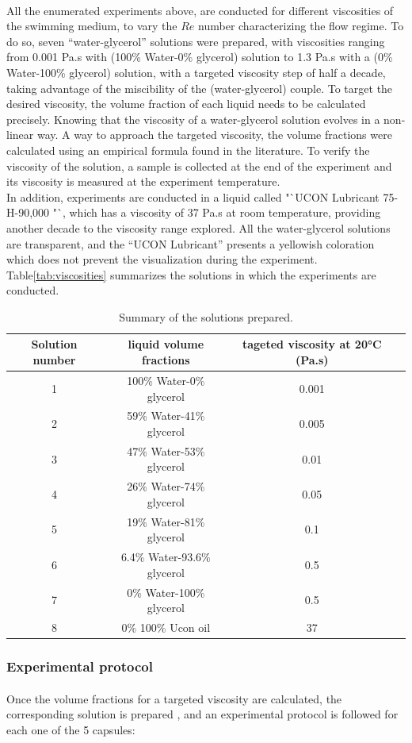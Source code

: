 \paragraph{}
All the enumerated experiments above, are conducted for different viscosities of the swimming medium, to vary the $Re$ number characterizing the flow regime. To do so, seven "`water-glycerol"' solutions were prepared, with viscosities ranging from 0.001 Pa.s with (100\% Water-0\% glycerol) solution  to 1.3 Pa.s with a (0\% Water-100\% glycerol) solution, with a targeted viscosity step of half a decade, taking advantage of the miscibility of the (water-glycerol) couple. To target the desired viscosity, the volume fraction of each liquid needs to be calculated precisely. Knowing that the viscosity of a water-glycerol solution evolves in a non-linear way\cite{viscositynonlinearCheng}. A way to approach the targeted viscosity, the volume fractions were calculated using an empirical formula found in the literature\cite{viscositynonlinearCheng}. To verify the viscosity of the solution, a sample is collected at the end of the experiment and its viscosity is measured at the experiment temperature.\\
In addition, experiments are conducted in a liquid called "`UCON Lubricant 75-H-90,000 "`, which has a viscosity of 37 Pa.s at room temperature, providing another decade to the viscosity range explored. All the water-glycerol solutions are transparent, and the "`UCON Lubricant"' presents a yellowish coloration which does not prevent the visualization during the experiment. 
Table\ref{tab:viscosities} summarizes the solutions in which the experiments are conducted.
\begin{table}[H]
	\centering
		\begin{adjustbox}{width=\textwidth}
			\begin{tabular}{|c|c|c|c|}
				\hline
				Solution number & liquid volume fractions & tageted viscosity at 20°C (Pa.s)\\
				\hline
				1&100\% Water-0\% glycerol&0.001\\
				2&59\% Water-41\% glycerol&0.005\\
				3&47\% Water-53\% glycerol&0.01\\
				4&26\% Water-74\% glycerol&0.05\\
				5&19\% Water-81\% glycerol&0.1\\
				6&6.4\% Water-93.6\% glycerol&0.5\\
				7&0\% Water-100\% glycerol&0.5\\
				8&0\% 100\% Ucon oil&37\\
			\end{tabular}
		\end{adjustbox}
	\caption{Summary of the solutions prepared.}
	\label{tab:pressure_truck}
\end{table}
  
\subsubsection{Experimental protocol}
\paragraph{}
Once the volume fractions for a targeted viscosity are calculated, the corresponding solution is prepared , and an experimental protocol is followed for each one of the 5 capsules:

